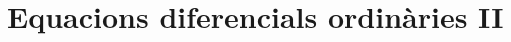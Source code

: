 \documentclass[../Apunts.tex]{subfiles}
\begin{document}
\part{Equacions diferencials ordinàries II}
\end{document}
